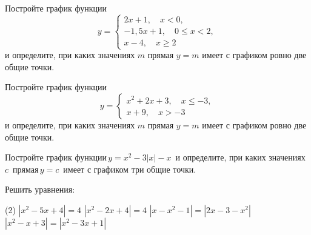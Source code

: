 \begin{class}[number=7]
	\begin{listofex}
		\item  Постройте график функции
		\[y=	 \left\{
		\begin{array}{l}
			2x+1, \quad x<0,\\
			-1,5x+1, \quad 0\leq x<2,\\
			x-4, \quad x\geq 2
		\end{array}
		\right. \]
		и определите, при каких значениях \( m \) прямая \( y=m \) имеет с графиком ровно две общие точки.
		\item Постройте график функции
		\[y=	 \left\{
		\begin{array}{l}
			x^2+2x+3, \quad x\leq-3,\\
			x+9, \quad x>-3
		\end{array}
		\right. \]
		и определите, при каких значениях \( m \) прямая \( y=m \) имеет с графиком ровно две общие точки.
		\item Постройте график функции \( y=x^2-3|x|-x \)  и определите, при каких значениях \( c \)  прямая \( y=c \)  имеет с графиком три общие точки.
		\item Решить уравнения:
		\begin{tasks}(2)
			\task \( |x^2-5x+4|=4 \)
			\task \( |x^2-2x+4|=4 \)
			\task \( |x-x^2-1|=|2x-3-x^2| \)
			\task \( |x^2-x+3|=|x^2-3x+1| \)
		\end{tasks}
	\end{listofex}
\end{class}

